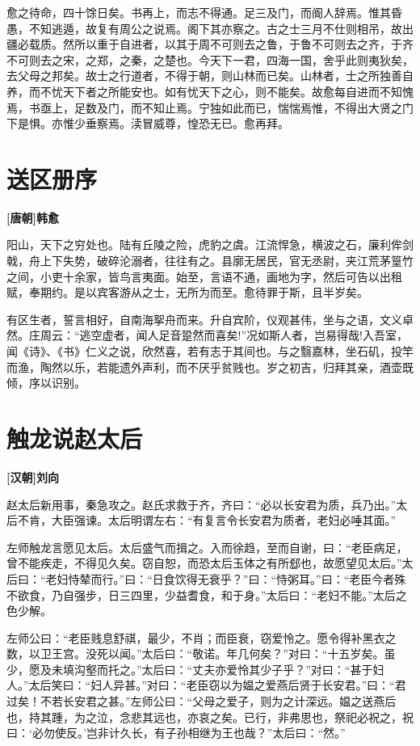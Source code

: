 \documentclass[UTF8,titlepage,oneside]{ctexbook}
\begin{document}
愈之待命，四十馀日矣。书再上，而志不得通。足三及门，而阍人辞焉。惟其昏愚，不知逃遁，故复有周公之说焉。阁下其亦察之。古之士三月不仕则相吊，故出疆必载质。然所以重于自进者，以其于周不可则去之鲁，于鲁不可则去之齐，于齐不可则去之宋，之郑，之秦，之楚也。今天下一君，四海一国，舍乎此则夷狄矣，去父母之邦矣。故士之行道者，不得于朝，则山林而已矣。山林者，士之所独善自养，而不忧天下者之所能安也。如有忧天下之心，则不能矣。故愈每自进而不知愧焉，书亟上，足数及门，而不知止焉。宁独如此而已，惴惴焉惟，不得出大贤之门下是惧。亦惟少垂察焉。渎冒威尊，惶恐无已。愈再拜。


\chapter*{送区册序}
\begin{center}
	\textbf{[唐朝]韩愈}
\end{center}

阳山，天下之穷处也。陆有丘陵之险，虎豹之虞。江流悍急，横波之石，廉利侔剑戟，舟上下失势，破碎沦溺者，往往有之。县廓无居民，官无丞尉，夹江荒茅篁竹之间，小吏十余家，皆鸟言夷面。始至，言语不通，画地为字，然后可告以出租赋，奉期约。是以宾客游从之士，无所为而至。愈待罪于斯，且半岁矣。

有区生者，誓言相好，自南海挐舟而来。升自宾阶，仪观甚伟，坐与之语，文义卓然。庄周云：“逃空虚者，闻人足音跫然而喜矣!”况如斯人者，岂易得哉!入吾室，闻《诗》、《书》仁义之说，欣然喜，若有志于其间也。与之翳嘉林，坐石矶，投竿而渔，陶然以乐，若能遗外声利，而不厌乎贫贱也。岁之初吉，归拜其亲，酒壶既倾，序以识别。


\chapter*{触龙说赵太后}
\begin{center}
	\textbf{[汉朝]刘向}
\end{center}


赵太后新用事，秦急攻之。赵氏求救于齐，齐曰：“必以长安君为质，兵乃出。”太后不肯，大臣强谏。太后明谓左右：“有复言令长安君为质者，老妇必唾其面。”


左师触龙言愿见太后。太后盛气而揖之。入而徐趋，至而自谢，曰：“老臣病足，曾不能疾走，不得见久矣。窃自恕，而恐太后玉体之有所郄也，故愿望见太后。”太后曰：“老妇恃辇而行。”曰：“日食饮得无衰乎？”曰：“恃粥耳。”曰：“老臣今者殊不欲食，乃自强步，日三四里，少益耆食，和于身。”太后曰：“老妇不能。”太后之色少解。


左师公曰：“老臣贱息舒祺，最少，不肖；而臣衰，窃爱怜之。愿令得补黑衣之数，以卫王宫。没死以闻。”太后曰：“敬诺。年几何矣？”对曰：“十五岁矣。虽少，愿及未填沟壑而托之。”太后曰：“丈夫亦爱怜其少子乎？”对曰：“甚于妇人。”太后笑曰：“妇人异甚。”对曰：“老臣窃以为媪之爱燕后贤于长安君。”曰：“君过矣！不若长安君之甚。”左师公曰：“父母之爱子，则为之计深远。媪之送燕后也，持其踵，为之泣，念悲其远也，亦哀之矣。已行，非弗思也，祭祀必祝之，祝曰：‘必勿使反。’岂非计久长，有子孙相继为王也哉？”太后曰：“然。”
\end{document}
